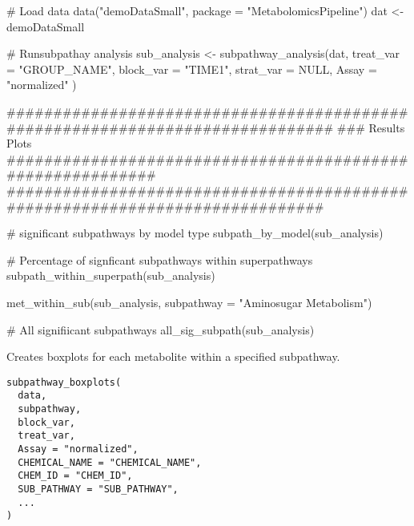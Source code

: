 \documentclass[a4paper]{book}
\begin{document}
\begin{Examples}
\begin{ExampleCode}
# Load data
data("demoDataSmall", package = "MetabolomicsPipeline")
dat <- demoDataSmall

# Runsubpathay analysis
sub_analysis <- subpathway_analysis(dat,
    treat_var = "GROUP_NAME",
    block_var = "TIME1",
    strat_var = NULL,
    Assay = "normalized"
)

##############################################################################
### Results Plots ###########################################################
#############################################################################

# significant subpathways by model type
subpath_by_model(sub_analysis)

# Percentage of signficant subpathways within superpathways
subpath_within_superpath(sub_analysis)

met_within_sub(sub_analysis, subpathway = "Aminosugar Metabolism")

# All signifiicant subpathways
all_sig_subpath(sub_analysis)

\end{ExampleCode}
\end{Examples}
%
\begin{Description}
Creates boxplots for each metabolite within a specified subpathway.
\end{Description}
%
\begin{Usage}
\begin{verbatim}
subpathway_boxplots(
  data,
  subpathway,
  block_var,
  treat_var,
  Assay = "normalized",
  CHEMICAL_NAME = "CHEMICAL_NAME",
  CHEM_ID = "CHEM_ID",
  SUB_PATHWAY = "SUB_PATHWAY",
  ...
)
\end{verbatim}
\end{Usage}
%
\end{document}
